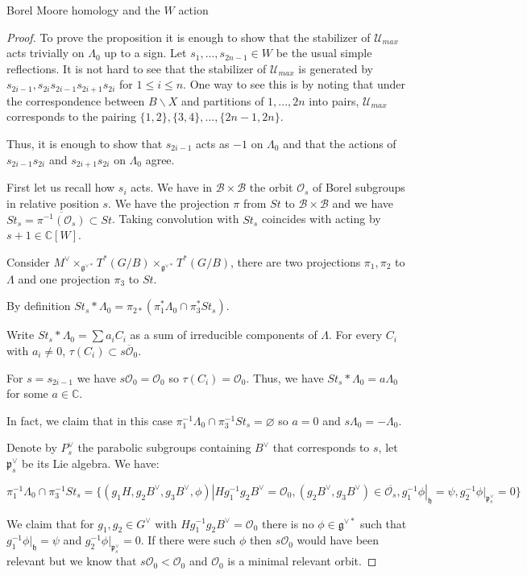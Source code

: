 \documentclass[12pt]{article}
\newcommand{\B}{\mathcal{B}}
\newcommand{\C}{\mathbb{C}}
\newcommand{\s}{\mathcal{O}}
\newcommand{\<}{\langle}
\renewcommand{\>}{\rangle}
\renewcommand{\emptyset}{\varnothing}
\theoremstyle{plain}
\theoremstyle{definition}
\begin{document}
\begin{section}{Borel Moore homology and the $W$ action}
\begin{proof}
    To prove the proposition it is enough to show that the stabilizer of $\mathcal{U}_{max}$ acts trivially on $\Lambda_0$ up to a sign. Let $s_1,...,s_{2n-1}\in W$ be the usual simple reflections. It is not hard to see that the stabilizer of  $\mathcal{U}_{max}$ is generated by $s_{2i-1},s_{2i}s_{2i-1}s_{2i+1}s_{2i}$ for $1\leq i\leq n$. One way to see this is by noting that under the correspondence between $B\backslash X$ and partitions of $1,...,2n$ into pairs, $\mathcal{U}_{max}$ corresponds to the pairing $\{1,2\},\{3,4\},...,\{2n-1,2n\}$.

    Thus, it is enough to show that $s_{2i-1}$ acts as $-1$ on $\Lambda_0$ and that the actions of $s_{2i-1}s_{2i}$ and $s_{2i+1}s_{2i}$ on $\Lambda_0$ agree.

    First let us recall how $s_i$ acts. We have in $\B\times \B$ the orbit $\s_s$ of Borel subgroups in relative position $s$. We have the projection $\pi$ from $St$ to $\B\times \B$ and we have $St_s=\overline{\pi^{-1}(\s_s)}\subset St$. Taking convolution with $St_s$ coincides with acting by $s+1\in \C[W]$.

    Consider $M^\vee\times_{\mathfrak{g}^{\vee*}}T^*(G/B)\times_{\mathfrak{g}^{\vee*}}T^*(G/B)$, there are two projections $\pi_1,\pi_2$ to $\Lambda$ and one projection $\pi_3$ to $St$.

    By definition $St_s*\Lambda_0=\pi_{2*}(\pi^*_1\Lambda_0\cap \pi_3^*St_s)$.

    Write $St_s*\Lambda_0=\sum a_iC_i$ as a sum of irreducible components of $\Lambda$. For every $C_i$ with $a_i\neq 0$, $\tau(C_i)\subset \overline{s\s_0}$.

 For $s=s_{2i-1}$ we have $s\s_0=\s_0$ so $\tau(C_i)= \s_0$. Thus, we have  $St_s*\Lambda_0=a\Lambda_0$ for some $a\in \C$.
 
 In fact, we claim that in this case $\pi^{-1}_1\Lambda_0\cap \pi_3^{-1}St_s=\emptyset$ so $a=0$ and $s\Lambda_0=-\Lambda_0$.

 Denote by $P^\vee_s$ the parabolic subgroups containing $B^\vee$ that corresponds to $s$, let $\mathfrak{p}^\vee_s$ be its Lie algebra. We have:

 $$\pi^{-1}_1\Lambda_0\cap \pi_3^{-1}St_s=\{(g_1H,g_2B^\vee,g_3B^\vee,\phi)|Hg_1^{-1}g_2B^\vee=\s_0,(g_2B^\vee,g_3B^\vee)\in \overline{\s_s},g_1^{-1}\phi|_{\mathfrak{h}}=\psi,g_2^{-1}\phi|_{\mathfrak{p}^\vee_s}=0 \}$$

We claim that for $g_1,g_2\in G^\vee$ with $Hg_1^{-1}g_2B^\vee=\s_0$ there is no $\phi\in \mathfrak{g}^{\vee*}$ such that $g_1^{-1}\phi|_{\mathfrak{h}}=\psi$ and $g_2^{-1}\phi|_{\mathfrak{p}^\vee_s}=0$. If there were such $\phi$ then $s\s_0$ would have been relevant but we know that $s\s_0<\s_0$ and $\s_0$ is a minimal relevant orbit.


\end{proof}
\end{section}
\end{document}
